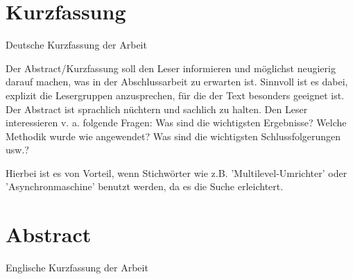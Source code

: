 \thispagestyle{empty}
\section*{Kurzfassung} 
Deutsche Kurzfassung der Arbeit

Der Abstract/Kurzfassung soll den Leser informieren und möglichst neugierig darauf machen, was in der Abschlussarbeit zu erwarten ist. Sinnvoll ist es dabei, explizit die Lesergruppen anzusprechen, für die der Text besonders geeignet ist. Der Abstract ist sprachlich nüchtern und sachlich zu halten. Den Leser interessieren v. a. folgende Fragen: Was sind die wichtigsten Ergebnisse? Welche Methodik wurde wie angewendet? Was sind die wichtigsten Schlussfolgerungen usw.?

Hierbei ist es von Vorteil, wenn Stichwörter wie z.B. 'Multilevel-Umrichter' oder 'Asynchronmaschine' benutzt werden, da es die Suche erleichtert.

\section*{Abstract}
Englische Kurzfassung der Arbeit

\null\newpage
\thispagestyle{empty}
\newpage
\cleardoublepage
